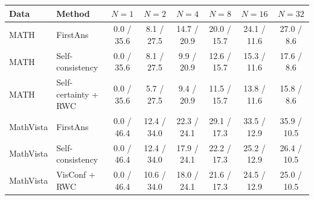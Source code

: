 \begin{tabular}{llcccccc}
\toprule
Data & Method & $N=1$ & $N=2$ & $N=4$ & $N=8$ & $N=16$ & $N=32$ \\
\midrule
MATH & FirstAns & 0.0 / 35.6 & 8.1 / 27.5 & 14.7 / 20.9 & 20.0 / 15.7 & 24.1 / 11.6 & 27.0 / 8.6 \\
MATH & Self-consistency & 0.0 / 35.6 & 8.1 / 27.5 & 9.9 / 20.9 & 12.6 / 15.7 & 15.3 / 11.6 & 17.6 / 8.6 \\
MATH & Self-certainty + RWC & 0.0 / 35.6 & 5.7 / 27.5 & 9.4 / 20.9 & 11.5 / 15.7 & 13.8 / 11.6 & 15.8 / 8.6 \\ \midrule
MathVista & FirstAns & 0.0 / 46.4 & 12.4 / 34.0 & 22.3 / 24.1 & 29.1 / 17.3 & 33.5 / 12.9 & 35.9 / 10.5 \\
MathVista & Self-consistency & 0.0 / 46.4 & 12.4 / 34.0 & 17.9 / 24.1 & 22.2 / 17.3 & 25.2 / 12.9 & 26.4 / 10.5 \\
MathVista & VisConf + RWC & 0.0 / 46.4 & 10.6 / 34.0 & 18.0 / 24.1 & 21.6 / 17.3 & 24.5 / 12.9 & 25.0 / 10.5 \\
\bottomrule
\end{tabular}
